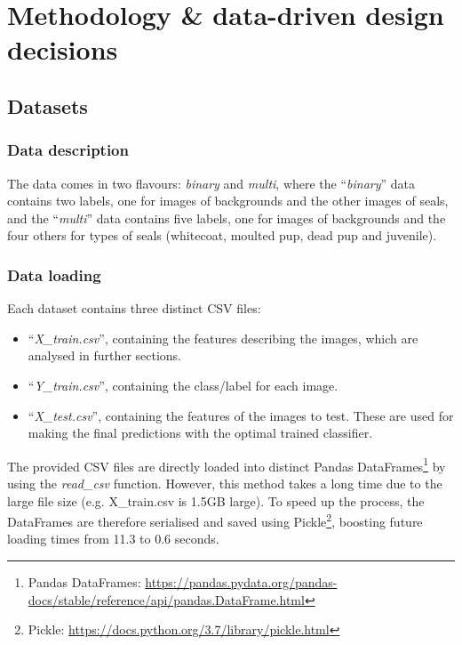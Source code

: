 \documentclass[letterpaper,12pt]{article}
\begin{document}

\section{Methodology \& data-driven design decisions}
\label{sec:methodology-design}

\subsection{Datasets}

\subsubsection{Data description}

The data comes in two flavours: \textit{binary} and \textit{multi}, where the ``\textit{binary}'' data contains two labels, one for images of backgrounds and the other images of seals, and  the ``\textit{multi}'' data contains five labels, one for images of backgrounds and the four others for types of seals (whitecoat, moulted pup, dead pup and juvenile).

\subsubsection{Data loading}
\label{sec:data-loading}

Each dataset contains three distinct CSV files:
\begin{itemize}
    \item ``\textit{X\_train.csv}'', containing the features describing the images, which are analysed in further sections.
    \item ``\textit{Y\_train.csv}'', containing the class/label for each image.
    \item ``\textit{X\_test.csv}'', containing the features of the images to test. These are used for making the final predictions with the optimal trained classifier.
\end{itemize}

The provided CSV files are directly loaded into distinct Pandas DataFrames\footnote{Pandas DataFrames: \url{https://pandas.pydata.org/pandas-docs/stable/reference/api/pandas.DataFrame.html}} by using the \textit{read\_csv} function. However, this method takes a long time due to the large file size (e.g. X\_train.csv is 1.5GB large). To speed up the process, the DataFrames are therefore serialised and saved using Pickle\footnote{Pickle: \url{https://docs.python.org/3.7/library/pickle.html}}, boosting future loading times from 11.3 to 0.6 seconds.
\end{document}
